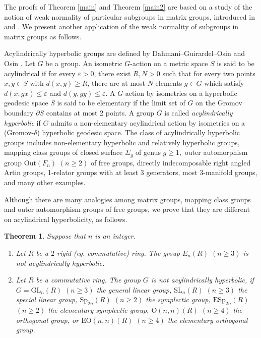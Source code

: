 \documentclass{gtpart}     %
\newtheorem{theorem}{Theorem}[section]
\begin{document}
\bigskip

The proofs of Theorem \ref{main} and Theorem \ref{main2} are based on a
study of the notion of weak normality of particular subgroups in matrix
groups, introduced in \cite{bf} and \cite{pt}. We present another
application of the weak normality of subgroups in matrix groups as follows.

Acylindrically hyperbolic groups are defined by Dahmani--Guirardel--Osin
\cite{dgo} and Osin \cite{Os}. Let $G$ be a group. An isometric $G$-action
on a metric space $S$ is said to be acylindrical if for every $\varepsilon
>0 $, there exist $R,N>0$ such that for every two points $x,y\in S$ with $%
d(x,y)\geq R$, there are at most $N$ elements $g\in G$ which satisfy $%
d(x,gx)\leq \varepsilon $ and $d(y,gy)\leq \varepsilon $. A $G$-action by
isometries on a hyperbolic geodesic space $S$ is said to be elementary if
the limit set of $G$ on the Gromov boundary $\partial S$ contains at most 2
points. A group $G$ is called \emph{acylindrically hyperbolic} if $G$ admits
a non-elementary acylindrical action by isometries on a (Gromov-$\delta $)
hyperbolic geodesic space. The class of acylindrically hyperbolic groups
includes non-elementary hyperbolic and relatively hyperbolic groups, mapping
class groups of closed surface $\Sigma _{g}$ of genus $g\geq 1,$ outer
automorphism group $\mathrm{Out}(F_{n})$ $(n\geq 2)$ of free groups,
directly indecomposable right angled Artin groups, 1-relator groups with at
least 3 generators, most 3-manifold groups, and many other examples.

Although there are many analogies among matrix groups, mapping class groups
and outer automorphism groups of free groups, we prove that they are
different on acylindrical hyperbolicity, as follows.

\begin{theorem}
\label{main3}Suppose that $n$ is an integer.

\begin{enumerate}
\item[(i)] Let $R$ be a $2$-rigid (\textsl{eg.} commutative) ring. The group
$E_{n}(R)$ $(n\geq 3)$ is not acylindrically hyperbolic.

\item[(ii)] Let $R$ be a commutative ring. The group $G$ is not
acylindrically hyperbolic, if $G=\mathrm{GL}_{n}(R)$ $(n\geq 3)$ the general
linear group, $\mathrm{SL}_{n}(R)$ $(n\geq 3)$ the special linear group, $%
\mathrm{Sp}_{2n}(R)$ $(n\geq 2)$ the symplectic group, $\mathrm{ESp}_{2n}(R)$
$(n\geq 2)$ the elementary symplectic group, $\mathrm{O}(n,n)(R)$ $(n\geq 4)$
the orthogonal group, or $\mathrm{EO}(n,n)(R)$ $(n\geq 4)$ the elementary
orthogonal group.
\end{enumerate}
\end{theorem}
\end{document}
